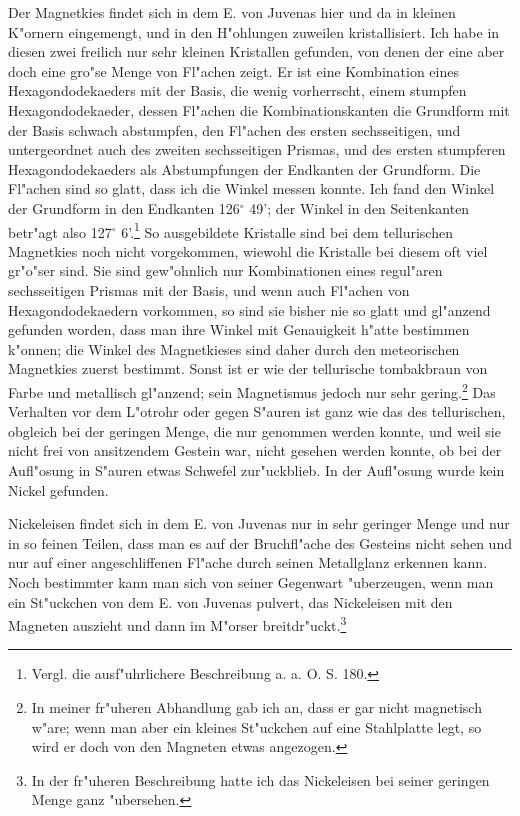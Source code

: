 \documentclass[a4paper, 11pt, oneside]{article}
\begin{document}
Der Magnetkies findet sich in dem E. von Juvenas hier und da in kleinen K"ornern eingemengt, und in den H"ohlungen zuweilen kristallisiert. Ich habe in diesen zwei freilich nur sehr kleinen Kristallen gefunden, von denen der eine aber doch eine gro"se Menge von Fl"achen zeigt. Er ist eine Kombination eines Hexagondodekaeders mit der Basis, die wenig vorherrscht, einem stumpfen Hexagondodekaeder, dessen Fl"achen die Kombinationskanten die Grundform mit der Basis schwach abstumpfen, den Fl"achen des ersten sechsseitigen, und untergeordnet auch des zweiten sechsseitigen Prismas, und des ersten stumpferen Hexagondodekaeders als Abstumpfungen der Endkanten der Grundform. Die Fl"achen sind so glatt, dass ich die Winkel messen konnte. Ich fand den Winkel der Grundform in den Endkanten 126$^{\circ}$ 49’; der Winkel in den Seitenkanten betr"agt also 127$^{\circ}$ 6’.\footnote{Vergl. die ausf"uhrlichere Beschreibung a. a. O. S. 180.} So ausgebildete Kristalle sind bei dem tellurischen Magnetkies noch nicht vorgekommen, wiewohl die Kristalle bei diesem oft viel gr"o"ser sind. Sie sind gew"ohnlich nur Kombinationen eines regul"aren sechsseitigen Prismas mit der Basis, und wenn auch Fl"achen von Hexagondodekaedern vorkommen, so sind sie bisher nie so glatt und gl"anzend gefunden worden, dass man ihre Winkel mit Genauigkeit h"atte bestimmen k"onnen; die Winkel des Magnetkieses sind daher durch den meteorischen Magnetkies zuerst bestimmt. Sonst ist er wie der tellurische tombakbraun von Farbe und metallisch gl"anzend; sein Magnetismus jedoch nur sehr gering.\footnote{In meiner fr"uheren Abhandlung gab ich an, dass er gar nicht magnetisch w"are; wenn man aber ein kleines St"uckchen auf eine Stahlplatte legt, so wird er doch von den Magneten etwas angezogen.} Das Verhalten vor dem L"otrohr oder gegen S"auren ist ganz wie das des tellurischen, obgleich bei der geringen Menge, die nur genommen werden konnte, und weil sie nicht frei von ansitzendem Gestein war, nicht gesehen werden konnte, ob bei der Aufl"osung in S"auren etwas Schwefel zur"uckblieb. In der Aufl"osung wurde kein Nickel gefunden.

Nickeleisen findet sich in dem E. von Juvenas nur in sehr geringer Menge und nur in so feinen Teilen, dass man es auf der Bruchfl"ache des Gesteins nicht sehen und nur auf einer angeschliffenen Fl"ache durch seinen Metallglanz erkennen kann. Noch bestimmter kann man sich von seiner Gegenwart "uberzeugen, wenn man ein St"uckchen von dem E. von Juvenas pulvert, das Nickeleisen mit den Magneten auszieht und dann im M"orser breitdr"uckt.\footnote{In der fr"uheren Beschreibung hatte ich das Nickeleisen bei seiner geringen Menge ganz "ubersehen.}
\end{document}
